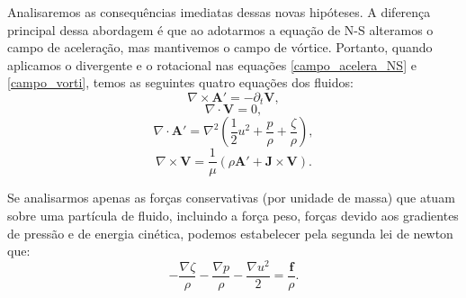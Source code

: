 Analisaremos as consequências imediatas dessas novas hipóteses. A diferença principal dessa abordagem é que ao adotarmos a equação de N-S alteramos o campo de aceleração, mas mantivemos o campo de vórtice. Portanto, quando aplicamos o divergente e o rotacional nas equações \ref{campo_acelera_NS}  e \ref{campo_vorti}, temos as seguintes quatro equações dos fluidos:
\begin{equation}\label{faradey_fluidos2NS}
    \nabla \times \textbf{A}' = -\partial_{t} \textbf{V},
\end{equation}
\begin{equation}\label{gauss_mag_fluid2NS}
    \nabla \cdot \textbf{V}=0,
\end{equation}
\begin{equation}\label{gauss_fluido2NS}
    \nabla \cdot \textbf{A}' = \nabla^{2} \left(\frac{1}{2}u^{2} + \frac{p}{\rho} + \frac{\zeta}{\rho}\right),
\end{equation}
\begin{equation}\label{amper-max_fluido2NS}
\nabla\times\textbf{V} = \frac{1}{\mu}\left(\rho \textbf{A}' + \textbf{J} \times \textbf{V}\right).
\end{equation}

Se analisarmos apenas as forças conservativas (por unidade de massa) que atuam sobre uma partícula de fluido, incluindo a força peso, forças devido aos gradientes de pressão e de energia cinética, podemos estabelecer pela segunda lei de newton que:
\begin{equation}\label{potencial_conserv}
    - \frac{\nabla \zeta}{\rho} - \frac{\nabla p}{\rho} - \frac{\nabla u^2}{2}= \frac{\textbf{f}}{\rho}.
\end{equation}

